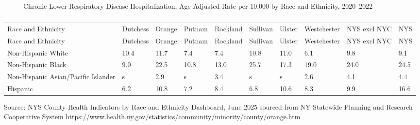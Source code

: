 \documentclass[
  english,
  letterpaper,
]{report}
\begin{document}
\begin{figure}


\caption{\label{fig-clrd-hospital-rande-aar}Chronic Lower Respiratory
Disease Hospitalization, Age-Adjusted Rate per 10,000 by Race and
Ethnicity, 2020--2022}

\end{figure}%

\begin{longtable}[]{@{}llllllllll@{}}

\caption{\label{tbl-clrd-hospital-rande-aar}Chronic Lower Respiratory
Disease Hospitalization, Age-Adjusted Rate per 10,000 by Race and
Ethnicity, 2020--2022}

\tabularnewline

\caption{}\label{T_9850b}\tabularnewline
\toprule\noalign{}
Race and Ethnicity & Dutchess & Orange & Putnam & Rockland & Sullivan &
Ulster & Westchester & NYS excl NYC & NYS \\
\midrule\noalign{}
\endfirsthead
\toprule\noalign{}
Race and Ethnicity & Dutchess & Orange & Putnam & Rockland & Sullivan &
Ulster & Westchester & NYS excl NYC & NYS \\
\midrule\noalign{}
\endhead
\bottomrule\noalign{}
\endlastfoot
Non-Hispanic White & 10.4 & 11.7 & 7.4 & 7.4 & 10.8 & 11.0 & 6.1 & 9.8 &
9.1 \\
Non-Hispanic Black & 9.0 & 22.5 & 10.8 & 13.0 & 25.7 & 17.3 & 19.0 &
24.0 & 24.5 \\
Non-Hispanic Asian/Pacific Islander & s & 2.9 & s & 3.4 & s & s & 2.6 &
4.1 & 4.4 \\
Hispanic & 6.2 & 10.8 & 7.2 & 8.4 & 6.8 & 10.6 & 8.3 & 9.9 & 16.6 \\

\end{longtable}

\begin{tcolorbox}[enhanced jigsaw, breakable, leftrule=.75mm, title=\textcolor{quarto-callout-note-color}{\faInfo}\hspace{0.5em}{Source}, bottomrule=.15mm, opacityback=0, left=2mm, colback=white, bottomtitle=1mm, coltitle=black, colbacktitle=quarto-callout-note-color!10!white, colframe=quarto-callout-note-color-frame, opacitybacktitle=0.6, toptitle=1mm, titlerule=0mm, arc=.35mm, rightrule=.15mm, toprule=.15mm]

Source: NYS County Health Indicators by Race and Ethnicity Dashboard,
June 2025 sourced from NY Statewide Planning and Research Cooperative
System
https://www.health.ny.gov/statistics/community/minority/county/orange.htm

\end{tcolorbox}
\end{document}
